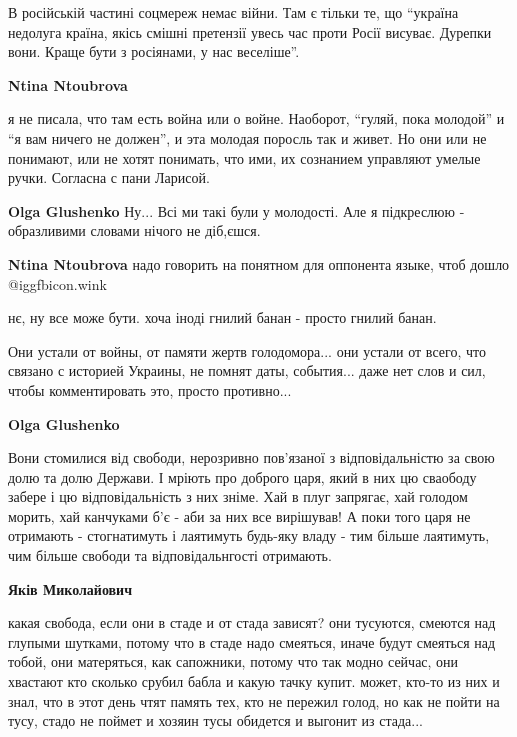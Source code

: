 \begin{itemize}
\begin{itemize}
В російській частині соцмереж немає війни. Там є тільки те, що \enquote{україна
недолуга країна, якісь смішні претензії увесь час проти Росії висуває. Дурепки
вони. Краще бути з росіянами, у нас веселіше}.

\textbf{Ntina Ntoubrova} 

я не писала, что там есть война или о войне. Наоборот, \enquote{гуляй, пока молодой} и \enquote{я
вам ничего не должен}, и эта молодая поросль так и живет. Но они или не
понимают, или не хотят понимать, что ими, их сознанием управляют умелые ручки.
Согласна с пани Ларисой.

\textbf{Olga Glushenko} Ну... Всі ми такі були у молодості. Але я підкреслюю - образливими словами нічого не діб,єшся.

\textbf{Ntina Ntoubrova} надо говорить на понятном для оппонента языке, чтоб дошло @igg{fbicon.wink} 

\end{itemize} %


нє, ну все може бути. хоча іноді гнилий банан - просто гнилий банан.


Они устали от войны, от памяти жертв голодомора... они устали от всего, что
связано с историей Украины, не помнят даты, события... даже нет слов и сил, чтобы
комментировать это, просто противно...

\begin{itemize} %
\textbf{Olga Glushenko} 

Вони стомилися від свободи, нерозривно пов'язаної з відповідальністю за свою
долю та долю Держави. І мріють про доброго царя, який в них цю сваободу забере
і цю відповідальність з них зніме. Хай в плуг запрягає, хай голодом морить, хай
канчуками б'є - аби за них все вирішував! А поки того царя не отримають -
стогнатимуть і лаятимуть будь-яку владу - тим більше лаятимуть, чим більше
свободи та відповідальнгості отримають.


\textbf{Яків Миколайович} 

какая свобода, если они в стаде и от стада зависят? они тусуются, смеются над
глупыми шутками, потому что в стаде надо смеяться, иначе будут смеяться над
тобой, они матеряться, как сапожники, потому что так модно сейчас, они хвастают кто
сколько срубил бабла и какую тачку купит. может, кто-то из них и знал, что в этот
день чтят память тех, кто не пережил голод, но как не пойти на тусу, стадо не
поймет и хозяин тусы обидется и выгонит из стада...


\end{itemize}
\end{itemize}
